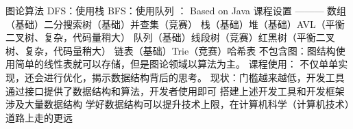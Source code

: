 {}\markdownRendererUlBeginTight
\markdownRendererUlItem 图论算法 DFS：使用栈 BFS：使用队列\markdownRendererUlItemEnd 
\markdownRendererUlEndTight \markdownRendererOlItemEnd 
\markdownRendererOlEnd \markdownRendererInterblockSeparator
{}： Based on Java\markdownRendererInterblockSeparator
{}\markdownRendererPipe{}\markdownRendererPipe{}课程设置\markdownRendererPipe{}\markdownRendererPipe{} \markdownRendererPipe{}---\markdownRendererPipe{}---\markdownRendererPipe{}---\markdownRendererPipe{} \markdownRendererPipe{}数组（基础）\markdownRendererPipe{}二分搜索树（基础）\markdownRendererPipe{}并查集（竞赛）\markdownRendererPipe{} \markdownRendererPipe{}栈（基础）\markdownRendererPipe{}堆（基础）\markdownRendererPipe{}AVL（平衡二叉树、复杂，代码量稍大）\markdownRendererPipe{} \markdownRendererPipe{}队列（基础）\markdownRendererPipe{}线段树（竞赛）\markdownRendererPipe{}红黑树（平衡二叉树、复杂，代码量稍大）\markdownRendererPipe{} \markdownRendererPipe{}链表（基础）\markdownRendererPipe{}Trie（竞赛）\markdownRendererPipe{}哈希表\markdownRendererPipe{}\markdownRendererInterblockSeparator
{}不包含图：图结构使用简单的线性表就可以存储，但是图论领域以算法为主。\markdownRendererInterblockSeparator
{}课程使用：\markdownRendererInterblockSeparator
{}不仅单单实现，还会进行优化，揭示数据结构背后的思考。\markdownRendererInterblockSeparator
{}\markdownRendererInterblockSeparator
{}现状：门槛越来越低，开发工具通过接口提供了数据结构和算法，开发者使用即可 搭建上述开发工具和开发框架涉及大量数据结构 \markdownRendererInterblockSeparator
{}学好数据结构可以提升技术上限，在计算机科学（计算机技术）道路上走的更远\relax